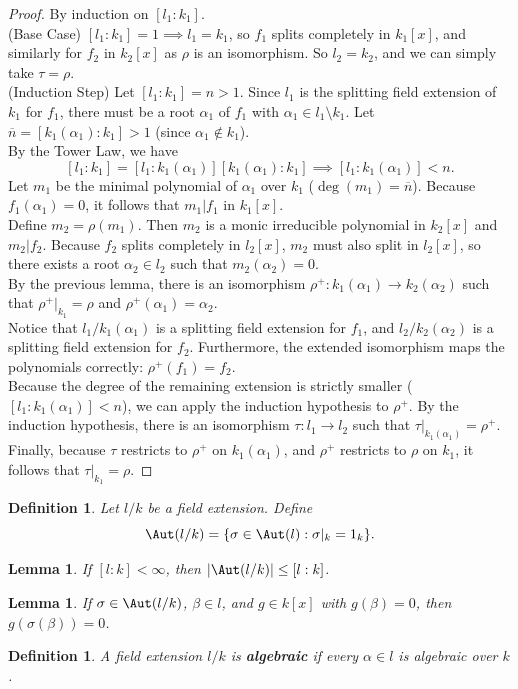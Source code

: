 \documentclass[a4paper,12pt]{article}
\newtheorem{lem}[thm]{Lemma}
\newtheorem{defn}[thm]{Definition}
\begin{document}
\begin{proof}
    By induction on $[l_1:k_1]$. \\
    (Base Case) $[l_1:k_1]=1\implies l_1=k_1$, so $f_1$ splits completely in $k_1[x]$, and similarly for $f_2$ in $k_2[x]$ as $\rho$ is an isomorphism. So $l_2=k_2$, and we can simply take $\tau=\rho$. \\
    (Induction Step) Let $[l_1:k_1]=n>1$. Since $l_1$ is the splitting field extension of $k_1$ for $f_1$, there must be a root $\alpha_1$ of $f_1$ with $\alpha_1\in l_1\setminus k_1$. Let $\overline{n}=[k_1(\alpha_1):k_1]>1$ (since $\alpha_1\notin k_1$). \\
    By the Tower Law, we have 
    \[
    [l_1:k_1]=[l_1:k_1(\alpha_1)][k_1(\alpha_1):k_1]\implies [l_1:k_1(\alpha_1)]<n
    .\] 
    Let $m_1$ be the minimal polynomial of $\alpha_1$ over $k_1$ ($\deg(m_1)=\overline{n}$). Because $f_1(\alpha_1)=0$, it follows that $m_1|f_1$ in $k_1[x]$. \\
    Define $m_2=\rho(m_1)$. Then $m_2$ is a monic irreducible polynomial in $k_2[x]$ and $m_2|f_2$. Because $f_2$ splits completely in $l_2[x]$, $m_2$ must also split in $l_2[x]$, so there exists a root $\alpha_2\in l_2$ such that $m_2(\alpha_2)=0$. \\
    By the previous lemma, there is an isomorphism $\rho^+:k_1(\alpha_1)\to k_2(\alpha_2)$ such that $\rho^+|_{k_1}=\rho$ and $\rho^+(\alpha_1)=\alpha_2.$\\
    Notice that $l_1/k_1(\alpha_1)$ is a splitting field extension for $f_1$, and $l_2/k_2(\alpha_2)$ is a splitting field extension for $f_2$. Furthermore, the extended isomorphism maps the polynomials correctly: $\rho^+(f_1)=f_2$. \\
    Because the degree of the remaining extension is strictly smaller ($[l_1:k_1(\alpha_1)]<n$), we can apply the induction hypothesis to $\rho^+$. By the induction hypothesis, there is an isomorphism $\tau:l_1\to l_2$ such that $\tau|_{k_1(\alpha_1)}=\rho^+$. \\
    Finally, because $\tau$ restricts to $\rho^+$ on $k_1(\alpha_1)$, and $\rho^+$ restricts to $\rho$ on $k_1$, it follows that $\tau|_{k_1}=\rho$.
\end{proof}
\begin{defn}
    Let $l/k$ be a field extension. Define
    \[
    \Aut(l/k)=\{\sigma\in \Aut(l): \sigma|_k=1_k\}.
    \]
\end{defn}
\begin{lem}
    If $[l:k]<\infty$, then $|\Aut(l/k)|\leq [l:k]$. 
\end{lem}
\begin{lem}
    If $\sigma\in \Aut(l/k)$, $\beta\in l$, and $g\in k[x]$ with $g(\beta)=0$, then $g(\sigma(\beta))=0$.
\end{lem}
\begin{defn}
    A field extension $l/k$ is \textbf{algebraic} if every $\alpha\in l$ is algebraic over $k$.
\end{defn}
\newpage
\end{document}
